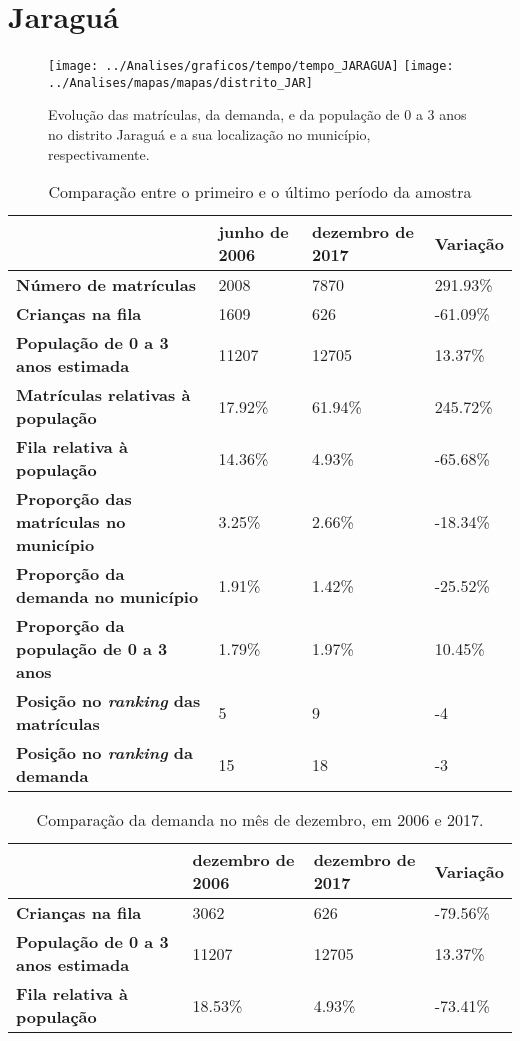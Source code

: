 \section{Jaraguá}
\begin{figure}[H]
\centering
\texttt{[image: ../Analises/graficos/tempo/tempo\_JARAGUA]}
\texttt{[image: ../Analises/mapas/mapas/distrito\_JAR]}
\caption{Evolução das matrículas, da demanda, e da população de 0 a 3 anos no distrito Jaraguá e a sua localização no município, respectivamente.}
\end{figure}
\begin{table}[H]
\begin{tabular}{l|l|l|l}
\textbf{}                                      & \textbf{junho de 2006}       & \textbf{dezembro de 2017}    & \textbf{Variação} \\ \hline
\textbf{Número de matrículas}                  & 2008 & 7870 & 291.93\% \\ \hline
\textbf{Crianças na fila}                      & 1609 & 626 & -61.09\% \\ \hline
\textbf{População de 0 a 3 anos estimada}      & 11207 & 12705 & 13.37\% \\ \hline
\textbf{Matrículas relativas à população}      & 17.92\% & 61.94\% & 245.72\% \\ \hline
\textbf{Fila relativa à população}             & 14.36\% & 4.93\% & -65.68\% \\ \hline
\textbf{Proporção das matrículas no município} & 3.25\% & 2.66\% & -18.34\% \\ \hline
\textbf{Proporção da demanda no município}     & 1.91\% & 1.42\% & -25.52\% \\ \hline
\textbf{Proporção da população de 0 a 3 anos}  & 1.79\% & 1.97\% & 10.45\% \\ \hline
\textbf{Posição no \textit{ranking} das matrículas}     & 5 & 9 & -4 \\ \hline
\textbf{Posição no \textit{ranking} da demanda}         & 15 & 18 & -3 \\ 
\end{tabular}
\caption{Comparação entre o primeiro e o último período da amostra}
\end{table}
\begin{table}[H]
\begin{tabular}{l|l|l|l}
\textbf{}                                 & \textbf{dezembro de 2006} & \textbf{dezembro de 2017} & \textbf{Variação} \\ \hline
\textbf{Crianças na fila}                      & 3062 & 626 & -79.56\% \\ \hline
\textbf{População de 0 a 3 anos estimada}      & 11207 & 12705 & 13.37\% \\ \hline
\textbf{Fila relativa à população}             & 18.53\% & 4.93\% & -73.41\% \\
\end{tabular}
\caption{Comparação da demanda no mês de dezembro, em 2006 e 2017.}
\end{table}
